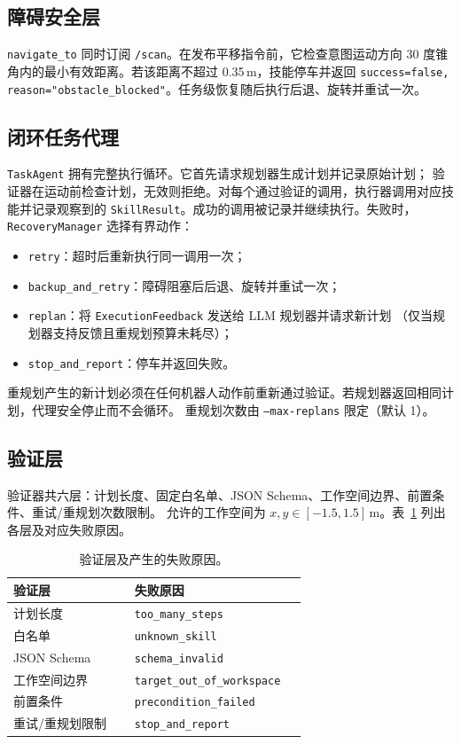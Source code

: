 \documentclass[10pt,twocolumn]{ctexart}
\begin{document}
\subsection{障碍安全层}
\texttt{navigate\_to} 同时订阅 \texttt{/scan}。在发布平移指令前，它检查意图运动方向
30 度锥角内的最小有效距离。若该距离不超过 0.35\,m，技能停车并返回
\texttt{success=false, reason="obstacle\_blocked"}。任务级恢复随后执行后退、旋转并重试一次。

\subsection{闭环任务代理}
\texttt{TaskAgent} 拥有完整执行循环。它首先请求规划器生成计划并记录原始计划；
验证器在运动前检查计划，无效则拒绝。对每个通过验证的调用，执行器调用对应技能并记录观察到的
\texttt{SkillResult}。成功的调用被记录并继续执行。失败时，\texttt{RecoveryManager} 选择有界动作：
\begin{itemize}
  \item \texttt{retry}：超时后重新执行同一调用一次；
  \item \texttt{backup\_and\_retry}：障碍阻塞后后退、旋转并重试一次；
  \item \texttt{replan}：将 \texttt{ExecutionFeedback} 发送给 LLM 规划器并请求新计划
        （仅当规划器支持反馈且重规划预算未耗尽）；
  \item \texttt{stop\_and\_report}：停车并返回失败。
\end{itemize}
重规划产生的新计划必须在任何机器人动作前重新通过验证。若规划器返回相同计划，代理安全停止而不会循环。
重规划次数由 \texttt{--max-replans} 限定（默认 1）。

\subsection{验证层}
验证器共六层：计划长度、固定白名单、JSON Schema、工作空间边界、前置条件、重试/重规划次数限制。
允许的工作空间为 $x,y \in [-1.5,1.5]$\,m。表~\ref{tab:validation} 列出各层及对应失败原因。

\begin{table}[t]
\centering
\caption{验证层及产生的失败原因。}
\label{tab:validation}
\small
\begin{tabular}{p{0.38\linewidth}p{0.54\linewidth}}
\toprule
验证层 & 失败原因 \\
\midrule
计划长度 & \texttt{too\_many\_steps} \\
白名单 & \texttt{unknown\_skill} \\
JSON Schema & \texttt{schema\_invalid} \\
工作空间边界 & \texttt{target\_out\_of\_workspace} \\
前置条件 & \texttt{precondition\_failed} \\
重试/重规划限制 & \texttt{stop\_and\_report} \\
\bottomrule
\end{tabular}
\end{table}
\end{document}
